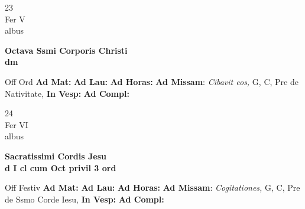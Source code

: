 \documentclass[10pt, openany]{book}
\begin{document}
        \begin{center}
            \begin{minipage}{3.5in}
                \vspace{2em}
                \begin{minipage}{0.5in}
                    {\Huge 23} \\
                    {\normalsize Fer V} \\
                    {\normalsize albus}
                \end{minipage}
                \begin{minipage}{3.0in}
                    \textbf{ \large Octava Ssmi Corporis Christi \\
                    \textnormal{\normalsize dm}} \\ 
                \end{minipage}
                \begin{justify}Off Ord
                    \textbf{Ad Mat: }
                    \textbf{Ad Lau: }
                    \textbf{Ad Horas: }\textbf{Ad Missam}: \textit{Cibavit eos,} G, C, Pre de Nativitate,  
                    \textbf{In Vesp: }
                    \textbf{Ad Compl: }
                \end{justify}
            \end{minipage}
        \end{center}
    
        \begin{center}
            \begin{minipage}{3.5in}
                \vspace{2em}
                \begin{minipage}{0.5in}
                    {\Huge 24} \\
                    {\normalsize Fer VI} \\
                    {\normalsize albus}
                \end{minipage}
                \begin{minipage}{3.0in}
                    \textbf{ \large Sacratissimi Cordis Jesu \\
                    \textnormal{\normalsize d I cl cum Oct privil 3 ord}} \\ 
                \end{minipage}
                \begin{justify}Off Festiv
                    \textbf{Ad Mat: }
                    \textbf{Ad Lau: }
                    \textbf{Ad Horas: }\textbf{Ad Missam}: \textit{Cogitationes,} G, C, Pre de Ssmo Corde Iesu,  
                    \textbf{In Vesp: }
                    \textbf{Ad Compl: }
                \end{justify}
            \end{minipage}
        \end{center}
    
\end{document}
